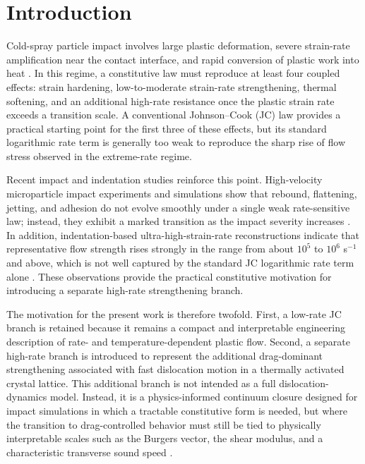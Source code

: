 \section{Introduction}
Cold-spray particle impact involves large plastic deformation, severe strain-rate amplification near the contact interface, and rapid conversion of plastic work into heat \cite{JohnsonCook1983,TaylorQuinney1934}. In this regime, a constitutive law must reproduce at least four coupled effects: strain hardening, low-to-moderate strain-rate strengthening, thermal softening, and an additional high-rate resistance once the plastic strain rate exceeds a transition scale. A conventional Johnson--Cook (JC) law provides a practical starting point for the first three of these effects, but its standard logarithmic rate term is generally too weak to reproduce the sharp rise of flow stress observed in the extreme-rate regime.

Recent impact and indentation studies reinforce this point. High-velocity microparticle impact experiments and simulations show that rebound, flattening, jetting, and adhesion do not evolve smoothly under a single weak rate-sensitive law; instead, they exhibit a marked transition as the impact severity increases \cite{Tiamiyu2021,Zhang2025Peridynamics}. In addition, indentation-based ultra-high-strain-rate reconstructions indicate that representative flow strength rises strongly in the range from about $10^5$ to $10^6$ s$^{-1}$ and above, which is not well captured by the standard JC logarithmic rate term alone \cite{Hassani2019,Chen2026Indentation}. These observations provide the practical constitutive motivation for introducing a separate high-rate strengthening branch.

The motivation for the present work is therefore twofold. First, a low-rate JC branch is retained because it remains a compact and interpretable engineering description of rate- and temperature-dependent plastic flow. Second, a separate high-rate branch is introduced to represent the additional drag-dominant strengthening associated with fast dislocation motion in a thermally activated crystal lattice. This additional branch is not intended as a full dislocation-dynamics model. Instead, it is a physics-informed continuum closure designed for impact simulations in which a tractable constitutive form is needed, but where the transition to drag-controlled behavior must still be tied to physically interpretable scales such as the Burgers vector, the shear modulus, and a characteristic transverse sound speed \cite{Blaschke2019PhononWind,Orowan1940}.

